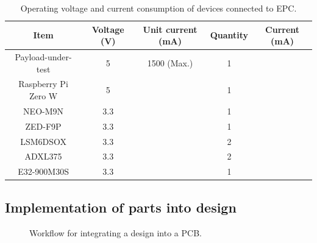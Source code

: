 \documentclass[a4paper,11pt]{article}
\begin{document}
\begin{table}[H]
  \centering
  \begin{tabular}{|c|c|c|c|c|}
    \hline
    \textbf{Item}       & \textbf{Voltage (\si{\volt})} & \textbf{Unit current (\si{\milli\ampere})} & \textbf{Quantity} & \textbf{Current (\si{\milli\ampere})} \\
    \hline
    Payload-under-test  & 5                             & 1500 (Max.)                                & 1                 &                                       \\
    Raspberry Pi Zero W & 5                             &                                            & 1                 &                                       \\
    NEO-M9N             & 3.3                           &                                            & 1                 &                                       \\
    ZED-F9P             & 3.3                           &                                            & 1                 &                                       \\
    LSM6DSOX            & 3.3                           &                                            & 2                 &                                       \\
    ADXL375             & 3.3                           &                                            & 2                 &                                       \\
    E32-900M30S         & 3.3                           &                                            & 1                 &                                       \\
    \hline
  \end{tabular}
  \caption{Operating voltage and current consumption of devices connected to EPC.}
  \label{tabl:epc-power-budget}
\end{table}


\subsection{Implementation of parts into design}

\begin{figure}[H]
  \centering
  
  \caption{Workflow for integrating a design into a PCB.}
  \label{fig:ecad-workflow}
\end{figure}
\end{document}
